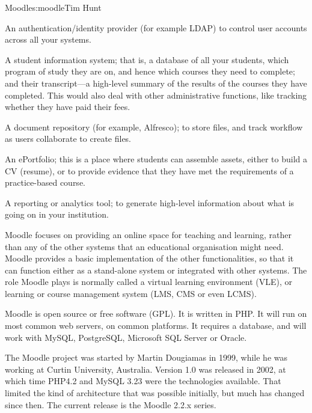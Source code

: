 \begin{aosachapter}{Moodle}{s:moodle}{Tim Hunt}
\begin{aosaitemize}

\item An authentication/identity provider (for example LDAP) to
  control user accounts across all your systems.

\item A student information system; that is, a database of all your
  students, which program of study they are on, and hence which
  courses they need to complete; and their transcript---a high-level 
  summary of the results of the courses they have
  completed. This would also deal with other administrative functions,
  like tracking whether they have paid their fees.

\item A document repository (for example, Alfresco); to store files,
  and track workflow as users collaborate to create files.

\item An ePortfolio; this is a place where students can assemble assets,
  either to build a CV (resume), or to
  provide evidence that they have met the requirements of a
  practice-based course.

\item A reporting or analytics tool; to generate high-level
  information about what is going on in your institution.

\end{aosaitemize}

Moodle focuses on providing an online space for
teaching and learning, rather than any of the other systems that an
educational organisation might need. Moodle provides a basic
implementation of the other functionalities, so that it can function either as
a stand-alone system or integrated with other systems. The role
Moodle plays is normally called a virtual learning environment (VLE),
or learning or course management system (LMS, CMS or even LCMS).

Moodle is open source or free software (GPL). It is written in PHP. It
will run on most common web servers, on common platforms. It requires
a database, and will work with MySQL, PostgreSQL, Microsoft SQL Server or
Oracle.

The Moodle project was started by Martin Dougiamas in 1999, while he
was working at Curtin University, Australia. Version 1.0 was released
in 2002, at which time PHP4.2 and MySQL 3.23 were the technologies
available. That limited the kind of architecture that was possible
initially, but much has changed since then. The current release is the
Moodle 2.2.x series.


\end{aosachapter}
